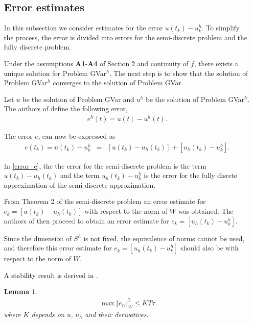\documentclass[../../main.tex]{subfiles}
\begin{document}
\subsection{Error estimates}\label{e_est}
In this subsection we consider estimates for the error $u(t_k) - u^h_k$. To simplify the process, the error is divided into errors for the semi-discrete problem and the fully discrete problem.

Under the assumptions \textbf{A1}-\textbf{A4} of Section 2 and continuity of $f$, there exists a unique solution for Problem GVar$^h$. The next step is to show that the solution of Problem GVar$^h$ converges to the solution of Problem GVar.

Let $u$ be the solution of Problem GVar and $u^h$ be the solution of Problem GVar$^h$. The authors of \cite{BV13} define the following error,
\begin{eqnarray}
	e^h(t) = u(t) - u^h(t). \label{Error}
\end{eqnarray}

\vspace*{40mm}


The error $e$, can now be expressed as
\begin{eqnarray}
	e(t_k) = u(t_k) - u^h_k & = & [u(t_k)-u_h(t_k)] + [u_h(t_k) - u^h_k]. \label{error_e}
\end{eqnarray}

In \eqref{error_e}, the the error for the semi-discrete problem is the term $u(t_k)-u_h(t_k)$ and the term $u_h(t_k) - u^h_k$ is the error for the fully disrete appreximation of the semi-discrete approximation.

From Theorem 2 of the semi-discrete problem an error estimate for
$e_k = [u(t_k)-u_h(t_k)]$ with respect to the norm of $W$ was obtained. The authors of \cite{BV13} then proceed to obtain an error estimate for $e_k = [u_h(t_k) - u^h_k]$. 

Since the dimension of $S^h$ is not fixed, the equivalence of norms
cannot be used, and therefore this error estimate for $e_k = [u_h(t_k) - u^h_k]$
should also be with respect to the norm of $W$.

A stability result is derived in \cite{BV13}.

\newtheorem*{DC_Lem3}{Lemma}
\begin{DC_Lem3}
	\begin{eqnarray*}
		\max\Vert e_{n}\Vert_{W}^{2}\leq KT\tau
	\end{eqnarray*}
	where $K$ depends on $u$, $u_h$ and their derivatives.
\end{DC_Lem3}
\end{document}
